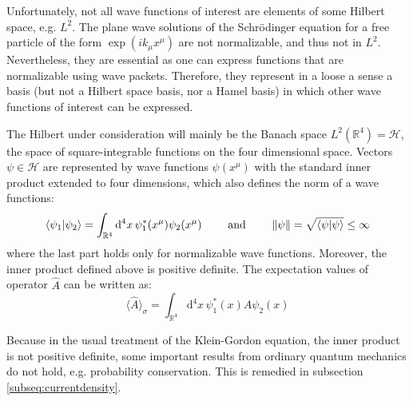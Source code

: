 \documentclass[a4paper,10pt]{article}
\numberwithin{equation}{section}
\begin{document}
Unfortunately, not all wave functions of interest are elements of some Hilbert space, e.g. $L^2$. The plane wave solutions of the Schr{\"o}dinger equation for a free particle of the form $\exp{\left( i k_\mu x^\mu \right)}$ are not normalizable, and thus not in $L^2$. Nevertheless, they are essential as one can express functions that are normalizable using wave packets. Therefore, they represent in a loose a sense a basis (but not a Hilbert space basis, nor a Hamel basis) in which other wave functions of interest can be expressed. 


The Hilbert under consideration will mainly be the Banach space $L^2(\mathbb{R}^4)= \mathcal{H}$, the space of square-integrable functions on the four dimensional space. Vectors $\psi\in\mathcal{H}$ are represented by wave functions $\psi (x^\mu)$ with the standard inner product extended to four dimensions, which also defines the norm of a wave functions:
\begin{equation}
    \langle \psi _{1}|\psi _{2}\rangle = \int_{\mathbb{R}^4} {\mathrm  {d}}^4 x \, \psi _{1}^{\ast }(x^\mu) \psi_{2}(x^\mu)  \qquad \text{ and } \qquad  \norm{\psi} = \sqrt{\braket{\psi|\psi}} \leq \infty
    \label{def:innerproduct}
\end{equation}
where the last part holds only for normalizable wave functions. Moreover, the inner product defined above is positive definite. The expectation values of operator $\hat{A}$ can be written as:
\begin{equation}
    \langle \hat{A} \rangle_\sigma = \int_{\mathbb{R}^4} {\mathrm  {d}}^4 x \, \psi _{1}^{\ast }(x) \hat{A} \psi_{2}(x) 
\end{equation}

Because in the usual treatment of the Klein-Gordon equation, the inner product is not positive definite, some important results from ordinary quantum mechanics do not hold, e.g. probability conservation. This is remedied in subsection \ref{subseq:currentdensity}. 
\end{document}
